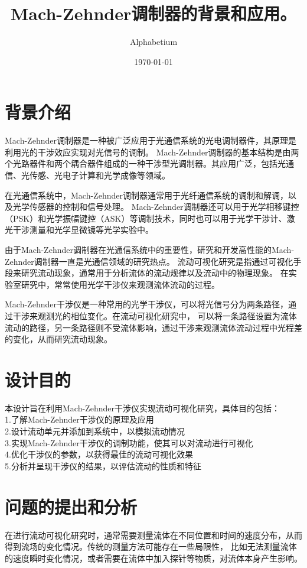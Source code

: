 \documentclass[12pt, a4paper, oneside]{article}
\title{Mach-Zehnder调制器的背景和应用。}
\date{\today}
\author{Alphabetium}
\begin{document}
\begin{spacing}{2.0}
\tableofcontents
\maketitle


\section{背景介绍}

Mach-Zehnder调制器是一种被广泛应用于光通信系统的光电调制器件，其原理是利用光的干涉效应实现对光信号的调制。
Mach-Zehnder调制器的基本结构是由两个光路器件和两个耦合器件组成的一种干涉型光调制器。其应用广泛，包括光通信、光传感、光电子计算和光学成像等领域。

在光通信系统中，Mach-Zehnder调制器通常用于光纤通信系统的调制和解调，以及光学传感器的控制和信号处理。
Mach-Zehnder调制器还可以用于光学相移键控（PSK）和光学振幅键控（ASK）等调制技术，同时也可以用于光学干涉计、激光干涉测量和光学显微镜等光学实验中。

由于Mach-Zehnder调制器在光通信系统中的重要性，研究和开发高性能的Mach-Zehnder调制器一直是光通信领域的研究热点。
流动可视化研究是指通过可视化手段来研究流动现象，通常用于分析流体的流动规律以及流动中的物理现象。
在实验室研究中，常常使用光学干涉仪来观测流体流动的过程。

Mach-Zehnder干涉仪是一种常用的光学干涉仪，可以将光信号分为两条路径，通过干涉来观测光的相位变化。在流动可视化研究中，
可以将一条路径设置为流体流动的路径，另一条路径则不受流体影响，通过干涉来观测流体流动过程中光程差的变化，从而研究流动现象。





\section{设计目的}
本设计旨在利用Mach-Zehnder干涉仪实现流动可视化研究，具体目的包括：
\\
1.了解Mach-Zehnder干涉仪的原理及应用
\\
2.设计流动单元并添加到系统中，以模拟流动情况
\\
3.实现Mach-Zehnder干涉仪的调制功能，使其可以对流动进行可视化
\\
4.优化干涉仪的参数，以获得最佳的流动可视化效果
\\
5.分析并呈现干涉仪的结果，以评估流动的性质和特征


\section{问题的提出和分析}
在进行流动可视化研究时，通常需要测量流体在不同位置和时间的速度分布，从而得到流场的变化情况。传统的测量方法可能存在一些局限性，
比如无法测量流体的速度瞬时变化情况，或者需要在流体中加入探针等物质，对流体本身产生影响。


\end{spacing}
\end{document}
